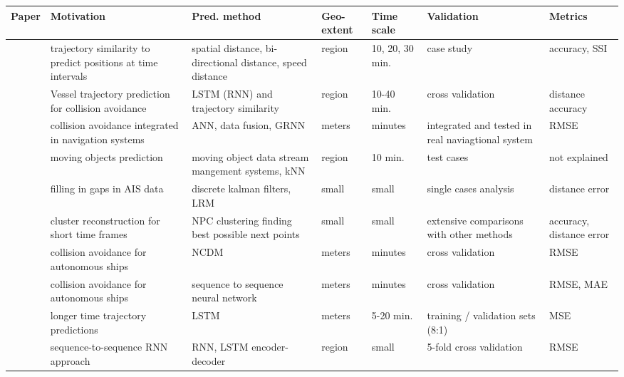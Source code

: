 \noindent
\begin{table}[htbp]
{\small\begin{tabularx}{1.2\textwidth}{p{0.6in} X X p{0.5in} p{0.4in} X p{0.5in}}
    \toprule
    \textbf{Paper} & \textbf{Motivation} & \textbf{Pred. method} & \textbf{Geo-extent} & \textbf{Time scale} & \textbf{Validation} & \textbf{Metrics} \\ \midrule
    \cite{Alizadeh2020PredictionTrajectory} & trajectory similarity to predict positions at time intervals & spatial distance, bi-directional distance, speed distance & region & 10, 20, 30 min. & case study & accuracy, SSI \\ \midrule
    \cite{Alizadeh2021VesselData} & Vessel trajectory prediction for collision avoidance & LSTM (RNN) and trajectory similarity & region & 10-40 min. & cross validation & distance accuracy \\ \midrule
    \cite{Borkowski2017TheFusion} & collision avoidance integrated in navigation systems & ANN, data fusion, GRNN & meters & minutes & integrated and tested in real naviagtional system & RMSE \\ \midrule
    \cite{Brandt2017MovingPrediction} & moving objects prediction & moving object data stream mangement systems, kNN  & region & 10 min. & test cases & not explained \\ \midrule
    \cite{Burger2020DiscretePrediction} & filling in gaps in AIS data & discrete kalman filters, LRM & small & small & single cases analysis & distance error \\ \midrule
    \cite{Chen2020ThePrediction} & cluster reconstruction for short time frames & NPC clustering finding best possible next points & small & small & extensive comparisons with other methods & accuracy, distance error \\ \midrule
    \cite{Dalsnes2018ThePrediction} & collision avoidance for autonomous ships & NCDM & meters & minutes & cross validation & RMSE \\ \midrule
    \cite{Dijt2020TrajectoryShips} & collision avoidance for autonomous ships & sequence to sequence neural network & meters & minutes & cross validation & RMSE, MAE \\ \midrule
    \cite{DIng2020ALSTM} & longer time trajectory predictions & LSTM & meters & 5-20 min. & training / validation sets (8:1) & MSE \\ \midrule
    \cite{Forti2020PredictionNetworks} & sequence-to-sequence RNN approach & RNN, LSTM encoder-decoder & region & small & 5-fold cross validation & RMSE \\ \midrule

\end{tabularx}}
\end{table}
